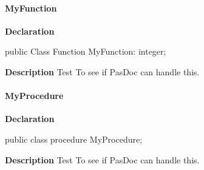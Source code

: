 \documentclass{report}
\newif\ifpdf
\begin{document}
\paragraph*{MyFunction}\hspace*{\fill}

\label{ok_class_function.TDummy-MyFunction}
\begin{list}{}{
\setlength{\itemindent}{0cm}
\setlength{\listparindent}{0cm}
\setlength{\leftmargin}{\evensidemargin}
\addtolength{\leftmargin}{\tmplength}
\settowidth{\labelsep}{X}
\addtolength{\leftmargin}{\labelsep}
\setlength{\labelwidth}{\tmplength}
}
\item[\textbf{Declaration}\hfill]
\ifpdf
\begin{flushleft}
\fi
\begin{ttfamily}
public Class Function MyFunction: integer;\end{ttfamily}

\ifpdf
\end{flushleft}
\fi

\par
\item[\textbf{Description}]
Test To see if PasDoc can handle this.

\end{list}
\paragraph*{MyProcedure}\hspace*{\fill}

\label{ok_class_function.TDummy-MyProcedure}
\begin{list}{}{
\setlength{\itemindent}{0cm}
\setlength{\listparindent}{0cm}
\setlength{\leftmargin}{\evensidemargin}
\addtolength{\leftmargin}{\tmplength}
\settowidth{\labelsep}{X}
\addtolength{\leftmargin}{\labelsep}
\setlength{\labelwidth}{\tmplength}
}
\item[\textbf{Declaration}\hfill]
\ifpdf
\begin{flushleft}
\fi
\begin{ttfamily}
public class procedure MyProcedure;\end{ttfamily}

\ifpdf
\end{flushleft}
\fi

\par
\item[\textbf{Description}]
Test To see if PasDoc can handle this.

\end{list}
\end{document}
